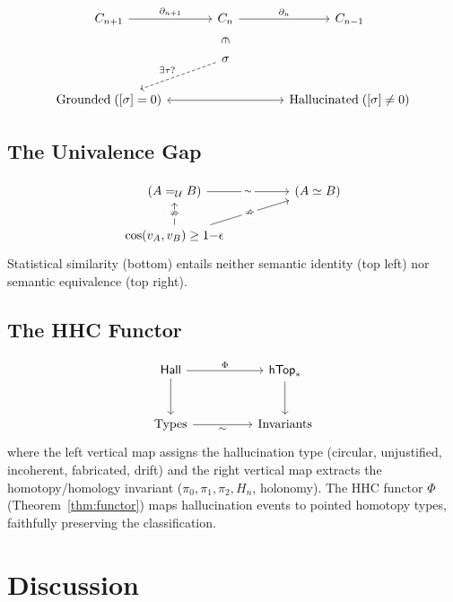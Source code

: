 \documentclass[11pt,a4paper]{article}
\theoremstyle{plain}
\theoremstyle{definition}
\begin{document}
\begin{equation}\label{diag:hhc}
\begin{tikzcd}[column sep=large]
C_{n+1} \arrow[r, "\partial_{n+1}"] & C_n \arrow[r, "\partial_n"] & C_{n-1} \\
& \sigma \arrow[u, phantom, "\in" {rotate=-90}] \arrow[dl, dashed, "\exists\tau?"'] & \\
\text{Grounded}\; ([\sigma]=0) & & \text{Hallucinated}\; ([\sigma]\neq 0) \arrow[ll, leftrightarrow]
\end{tikzcd}
\end{equation}

\subsection{The Univalence Gap}

\[
\begin{tikzcd}[column sep=huge]
(A =_{\mathcal{U}} B) \arrow[r, "\sim" {description}] & (A \simeq B) \\
\cos(v_A, v_B) \geq 1{-}\epsilon \arrow[u, "\nRightarrow" {description}] \arrow[ur, "\nRightarrow" {description}] &
\end{tikzcd}
\]
Statistical similarity (bottom) entails neither semantic identity (top left) nor semantic equivalence (top right).

\subsection{The HHC Functor}

\[
\begin{tikzcd}[column sep=huge, row sep=large]
\mathsf{Hall} \arrow[r, "\Phi"] \arrow[d] & \mathsf{hTop}_* \arrow[d] \\
\text{Types} \arrow[r, "\sim"'] & \text{Invariants}
\end{tikzcd}
\]
where the left vertical map assigns the hallucination type (circular, unjustified, incoherent, fabricated, drift) and the right vertical map extracts the homotopy/homology invariant ($\pi_0, \pi_1, \pi_2, H_n$, holonomy).
The HHC functor $\Phi$ (Theorem~\ref{thm:functor}) maps hallucination events to pointed homotopy types, faithfully preserving the classification.

\section{Discussion}\label{sec:discussion}
\end{document}
